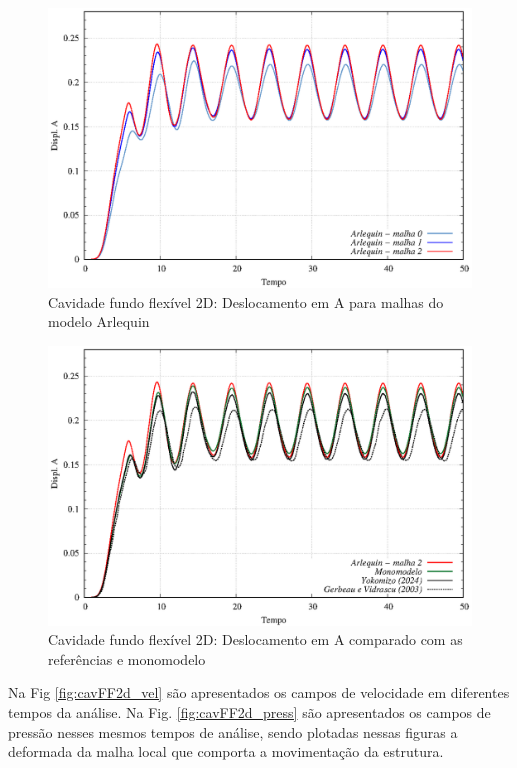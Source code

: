 \documentclass[tese_patricia]{subfiles}
\begin{document}
\begin{figure}[htb!]
	\centering 
	\includegraphics[scale=1.0,trim=0cm 0cm 0cm 0cm, clip=true]{Imagens/Cap7/cavFF2d_Arlq_deslA.eps}	
	\caption{Cavidade fundo flexível 2D: Deslocamento em A para malhas do modelo Arlequin}
	\label{fig:cavFF2d_Arlq_deslA}
\end{figure}

\begin{figure}[htb!]
	\centering 
	\includegraphics[scale=1.0,trim=0cm 0cm 0cm 0cm, clip=true]{Imagens/Cap7/cavFF2d_deslA.eps}	
	\caption{Cavidade fundo flexível 2D: Deslocamento em A comparado com as referências e monomodelo}
	\label{fig:cavFF2d_deslA}
\end{figure}

Na Fig \ref{fig:cavFF2d_vel} são apresentados os campos de velocidade em diferentes tempos da análise. Na Fig. \ref{fig:cavFF2d_press} são apresentados os campos de pressão nesses mesmos tempos de análise, sendo plotadas nessas figuras a deformada da malha local que comporta a movimentação da estrutura.
\end{document}
